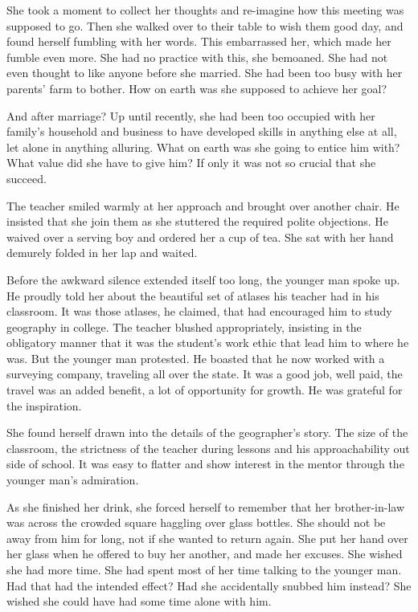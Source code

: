 \documentclass{article}
\begin{document}
She took a moment to collect her thoughts and re-imagine how this meeting was supposed to go. Then she walked over to their table to wish them good day, and found herself fumbling with her words. This embarrassed her, which made her fumble even more. She had no practice with this, she bemoaned.  She had not even thought to like anyone before she married. She had been too busy with her parents' farm to bother. How on earth was she supposed to achieve her goal? 

And after marriage? Up until recently, she had been too occupied with her family's household and business to have developed skills in anything else at all, let alone in anything alluring. What on earth was she going to entice him with? What value did she have to give him? If only it was not so crucial that she succeed. 

The teacher smiled warmly at her approach and brought over another chair. He insisted that she join them as she stuttered the required polite objections. He waived over a serving boy and ordered her a cup of tea. She sat with her hand demurely folded in her lap and waited. 

Before the awkward silence extended itself too long, the younger man spoke up. He proudly told her about the beautiful set of atlases his teacher had in his classroom. It was those atlases, he claimed, that had encouraged him to study geography in college. The teacher blushed appropriately, insisting in the obligatory manner that it was the student's work ethic that lead him to where he was. But the younger man protested. He boasted that he now worked with a surveying company, traveling all over the state. It was a good job, well paid, the travel was an added benefit, a lot of opportunity for growth. He was grateful for the inspiration. 

She found herself drawn into the details of the geographer's story. The size of the classroom, the strictness of the teacher during lessons and his approachability out side of school. It was easy to flatter and show interest in the mentor through the younger man's admiration. 

As she finished her drink, she forced herself to remember that her brother-in-law was across the crowded square haggling over glass bottles. She should not be away from him for long, not if she wanted to return again. She put her hand over her glass when he offered to buy her another, and made her excuses. She wished she had more time. She had spent most of her time talking to the younger man. Had that had the intended effect? Had she accidentally snubbed him instead? She wished she could have had some time alone with him.
\end{document}
